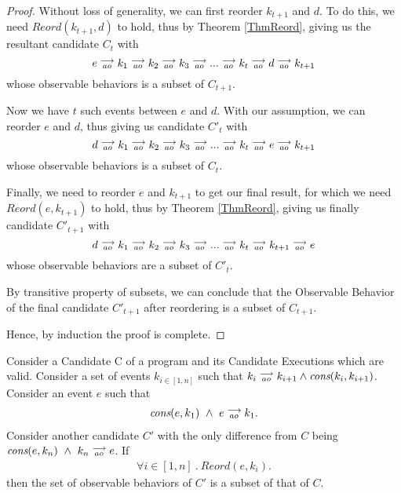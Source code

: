 \begin{proof}
        Without loss of generality, we can first reorder $k_{t+1}$ and $d$. 
        To do this, we need $Reord(k_{t+1}, d)$ to hold, thus by Theorem \ref{ThmReord}, giving us the resultant candidate $C_t$ with  
        \[
            e\stackrel{\longrightarrow}{_{ao}}k_1\stackrel{\longrightarrow}{_{ao}}k_2\stackrel{\longrightarrow}{_{ao}}k_3\stackrel{\longrightarrow}{_{ao}}...\stackrel{\longrightarrow}{_{ao}}k_t\stackrel{\longrightarrow}{_{ao}}d\stackrel{\longrightarrow}{_{ao}}k_{t+1}  
        \]
        whose observable behaviors is a subset of $C_{t+1}$. 

        Now we have $t$ such events between $e$ and $d$. With our assumption, we can reorder $e$ and $d$, thus giving us candidate $C'_t$ with 
        \[
            d\stackrel{\longrightarrow}{_{ao}}k_1\stackrel{\longrightarrow}{_{ao}}k_2\stackrel{\longrightarrow}{_{ao}}k_3\stackrel{\longrightarrow}{_{ao}}...\stackrel{\longrightarrow}{_{ao}}k_t\stackrel{\longrightarrow}{_{ao}}e\stackrel{\longrightarrow}{_{ao}}k_{t+1}  
        \]
        whose observable behaviors is a subset of $C_{t}$. 

        Finally, we need to reorder $e$ and $k_{t+1}$ to get our final result, for which we need $Reord(e, k_{t+1})$ to hold, thus by Theorem \ref{ThmReord},  giving us finally candidate $C'_{t+1}$ with
        \[
            d\stackrel{\longrightarrow}{_{ao}}k_1\stackrel{\longrightarrow}{_{ao}}k_2\stackrel{\longrightarrow}{_{ao}}k_3\stackrel{\longrightarrow}{_{ao}}...\stackrel{\longrightarrow}{_{ao}}k_t\stackrel{\longrightarrow}{_{ao}}k_{t+1}\stackrel{\longrightarrow}{_{ao}}e  
        \]
        whose observable behaviors are a subset of $C'_t$. 

        By transitive property of subsets, we can conclude that the Observable Behavior of the final candidate $C'_{t+1}$ after reordering is a subset of $C_{t+1}$.

        Hence, by induction the proof is complete. 
\end{proof}
    
\begin{corollary}
    \label{CorollCodeMotion1}
    Consider a Candidate C of a program and its Candidate Executions which are valid. 
    Consider a set of events $k_{i \in[1,n]}$ such that $k_i\stackrel{\longrightarrow}{_{ao}}k_{i+1} \wedge \textit{cons}(k_i,k_{i+1})$.
    Consider an event $e$ such that 
    \begin{align*}
        \textit{cons}(e,k_1) \ \wedge \ e\stackrel{\longrightarrow}{_{ao}}k_1.  
    \end{align*}
    Consider another candidate $C'$ with the only difference from $C$ being $\cons{e}{k_n} \ \wedge \ \reln{k_n}{ao}{e}$.
    If 
    \begin{align*}
        \forall i \in [1,n] \ . \ Reord(e,k_i).
    \end{align*}
    then the set of observable behaviors of $C'$ is a subset of that of $C$.  
\end{corollary}

